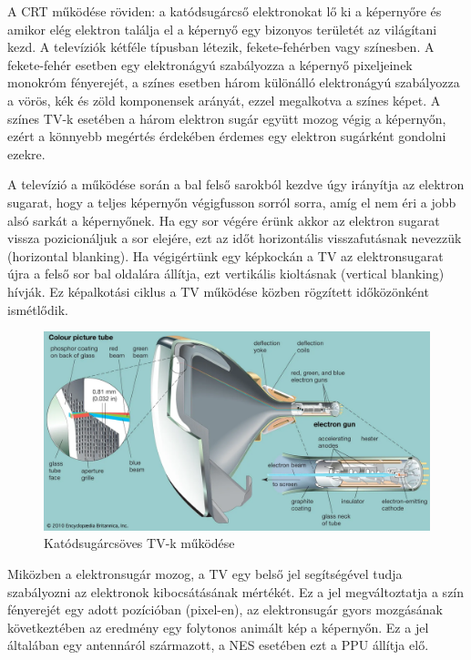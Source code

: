 	A CRT működése röviden: a katódsugárcső elektronokat lő ki a képernyőre és amikor elég elektron találja el a képernyő egy bizonyos területét az világítani kezd. A televíziók kétféle típusban létezik, fekete-fehérben vagy színesben. A fekete-fehér esetben egy elektronágyú szabályozza a képernyő pixeljeinek monokróm fényerejét, a színes esetben három különálló elektronágyú szabályozza a vörös, kék és zöld komponensek arányát, ezzel megalkotva a színes képet. A színes TV-k esetében a három elektron sugár együtt mozog végig a képernyőn, ezért a könnyebb megértés érdekében érdemes egy elektron sugárként gondolni ezekre. 
	
	A televízió a működése során a bal felső sarokból kezdve úgy irányítja az elektron sugarat, hogy a teljes képernyőn végigfusson sorról sorra, amíg el nem éri a jobb alsó sarkát a képernyőnek. Ha egy sor végére érünk akkor az elektron sugarat vissza pozicionáljuk a sor elejére, ezt az időt horizontális visszafutásnak nevezzük (horizontal blanking). Ha végigértünk egy képkockán a TV az elektronsugarat újra a felső sor bal oldalára állítja, ezt vertikális kioltásnak (vertical blanking) hívják. Ez képalkotási ciklus a TV működése közben rögzített időközönként ismétlődik.
	
	\begin{figure}[H]
		\centering
		\includegraphics[width=150mm, keepaspectratio]{figures/CRT-TV}
		\caption{Katódsugárcsöves TV-k működése \cite{Catode_TV}}
		\label{fig:CRT-TV}
	\end{figure}
	
	Miközben a elektronsugár mozog, a TV egy belső jel segítségével tudja szabályozni az elektronok kibocsátásának mértékét. Ez a jel megváltoztatja a szín fényerejét egy adott pozícióban (pixel-en), az elektronsugár gyors mozgásának következtében az eredmény egy folytonos animált kép a képernyőn. Ez a jel általában egy antennáról származott, a NES esetében ezt a PPU állítja elő. 
	
